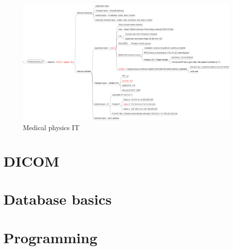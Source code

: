 \documentclass[]{book}
\theoremstyle{definition}
\theoremstyle{definition}
\theoremstyle{definition}
\theoremstyle{remark}
\begin{document}
\begin{figure}

{\centering \includegraphics{figures/mp_it} 

}

\caption{Medical physics IT}\label{fig:it}
\end{figure}

\section{DICOM}\label{dicom}

\section{Database basics}\label{database-basics}

\section{Programming}\label{programming}


\end{document}
